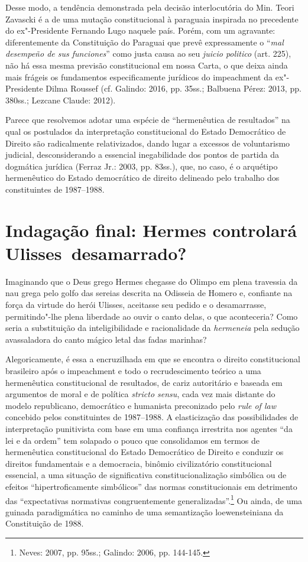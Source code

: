Desse modo, a tendência demonstrada pela decisão interlocutória do Min.
Teori Zavascki é a de uma mutação constitucional à paraguaia inspirada
no precedente do ex"-Presidente Fernando Lugo naquele país. Porém, com um
agravante: diferentemente da Constituição do Paraguai que prevê
expressamente o ``\emph{mal desempeño de sus funciones}'' como justa
causa ao seu \emph{juicio politico} (art. 225), não há essa mesma
previsão constitucional em nossa Carta, o que deixa ainda mais frágeis
os fundamentos especificamente jurídicos do impeachment da
ex"-Presidente Dilma Roussef (cf. Galindo: 2016, pp. 35ss.; Balbuena
Pérez: 2013, pp. 380ss.; Lezcane Claude: 2012).

Parece que resolvemos adotar uma espécie de ``hermenêutica de
resultados'' na qual os postulados da interpretação constitucional do
Estado Democrático de Direito são radicalmente relativizados, dando
lugar a excessos de voluntarismo judicial, desconsiderando a essencial
inegabilidade dos pontos de partida da dogmática jurídica (Ferraz Jr.:
2003, pp. 83ss.), que, no caso, é o arquétipo hermenêutico do Estado
democrático de direito delineado pelo trabalho dos constituintes de
1987--1988.

\section{Indagação final: Hermes controlará Ulisses~desamarrado?}

Imaginando que o Deus grego Hermes chegasse do Olimpo em plena travessia
da nau grega pelo golfo das sereias descrita na Odisseia de Homero e,
confiante na força da virtude do herói Ulisses, aceitasse seu pedido e o
desamarrasse, permitindo"-lhe plena liberdade ao ouvir o canto delas, o
que aconteceria? Como seria a substituição da inteligibilidade e
racionalidade da \emph{hermeneia} pela sedução avassaladora do canto
mágico letal das fadas marinhas?

Alegoricamente, é essa a encruzilhada em que se encontra o direito
constitucional brasileiro após o impeachment e todo o
recrudescimento teórico a uma hermenêutica constitucional de resultados,
de cariz autoritário e baseada em argumentos de moral e de política
\emph{stricto sensu}, cada vez mais distante do modelo republicano,
democrático e humanista preconizado pelo \emph{rule of law} concebido
pelos constituintes de 1987--1988. A elasticização das possibilidades de
interpretação punitivista com base em uma confiança irrestrita nos
agentes ``da lei e da ordem'' tem solapado o pouco que consolidamos em
termos de hermenêutica constitucional do Estado Democrático de Direito e
conduzir os direitos fundamentais e a democracia, binômio civilizatório
constitucional essencial, a uma situação de significativa
constitucionalização simbólica ou de efeitos ``hipertroficamente
simbólicos'' das normas constitucionais em detrimento das ``expectativas
normativas congruentemente generalizadas''.\footnote{Neves: 2007, pp. 95ss.;
Galindo: 2006, pp. 144-145.} Ou ainda, de uma guinada paradigmática no
caminho de uma semantização loewensteiniana da Constituição de 1988.

